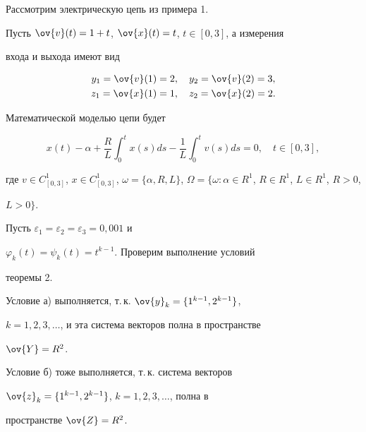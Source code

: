 \begin{exam}


Рассмотрим электрическую цепь из примера 1.





Пусть $\ov{v}(t)=1+t$, $\ov{x}(t)=t$, $t\in[0,3]$, а измерения


входа и выхода имеют вид


\begin{gather}


y_1=\ov{v}(1)=2, \quad y_2=\ov{v}(2)=3, \\


z_1=\ov{x}(1)=1, \quad z_2=\ov{x}(2)=2.


\end{gather}


Математической моделью цепи будет


\begin{equation}


x(t)-\alpha+\frac{R}{L}\int^t_0


x(s)ds-\frac{1}{L}\int^t_0 v(s)ds=0, \quad t\in[0,3],


\end{equation}


где $v\in C^1_{[0,3]}$, $x\in C^1_{[0,3]}$, $\omega = \{\alpha,


R, L\}$, $\Omega=\{\omega:\alpha\in R^1$, $R\in R^1$, $L\in R^1$, $R>0$,


$L>0\}$.





Пусть $\varepsilon_1=\varepsilon_2=\varepsilon_3=0{,}001$ и


$\varphi_k(t)=\psi_k(t)=t^{k-1}$. Проверим выполнение условий


теоремы 2.





Условие а) выполняется, т.\,к. $\ov{y}_k=\{1^{k-1}, 2^{k-1}\}$,


$k=1,2,3,\dotsc$, и эта система векторов полна в пространстве


$\ov{Y}=R^2$.





Условие б) тоже выполняется, т.\,к. система векторов


$\ov{z}_k=\{1^{k-1},2^{k-1}\}$, $k=1,2,3,\dotsc$, полна в


пространстве $\ov{Z}=R^2$.






\end{exam}
